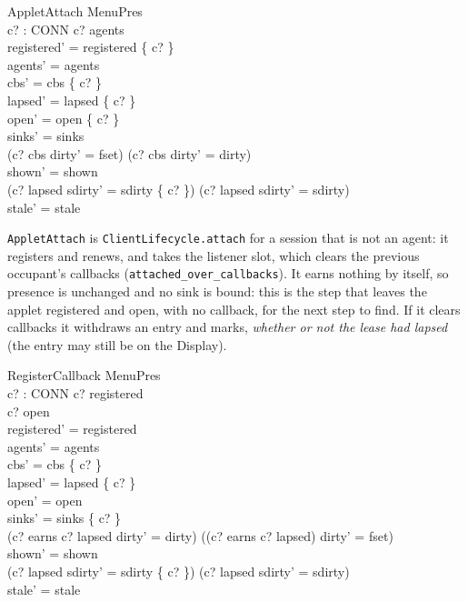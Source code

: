 \documentclass[a4paper,10pt,fleqn]{article}
\begin{document}
\begin{schema}{AppletAttach}
  \Delta MenuPres \\
  c? : CONN
\where
  c? \notin agents \\
  registered' = registered \cup \{ c? \} \\
  agents' = agents \\
  cbs' = cbs \setminus \{ c? \} \\
  lapsed' = lapsed \setminus \{ c? \} \\
  open' = open \cup \{ c? \} \\
  sinks' = sinks \\
  (c? \in cbs \land dirty' = fset) \lor (c? \notin cbs \land dirty' = dirty) \\
  shown' = shown \\
  (c? \in lapsed \land sdirty' = sdirty \cup \{ c? \}) \lor
    (c? \notin lapsed \land sdirty' = sdirty) \\
  stale' = stale
\end{schema}

\texttt{AppletAttach} is \texttt{ClientLifecycle.attach} for a session that is
not an agent: it registers and renews, and takes the listener slot, which
clears the previous occupant's callbacks (\texttt{attached\_over\_callbacks}).
It earns nothing by itself, so presence is unchanged and no sink is bound: this
is the step that leaves the applet registered and open, with no callback, for
the next step to find. If it clears callbacks it withdraws an entry and marks,
\emph{whether or not the lease had lapsed} (the entry may still be on the
Display).

\begin{schema}{RegisterCallback}
  \Delta MenuPres \\
  c? : CONN
\where
  c? \in registered \\
  c? \in open \\
  registered' = registered \\
  agents' = agents \\
  cbs' = cbs \cup \{ c? \} \\
  lapsed' = lapsed \setminus \{ c? \} \\
  open' = open \\
  sinks' = sinks \oplus \{ c?  \} \\
  (c? \in earns \land c? \notin lapsed \land dirty' = dirty) \lor
    ((c? \notin earns \lor c? \in lapsed) \land dirty' = fset) \\
  shown' = shown \\
  (c? \in lapsed \land sdirty' = sdirty \cup \{ c? \}) \lor
    (c? \notin lapsed \land sdirty' = sdirty) \\
  stale' = stale
\end{schema}
\end{document}
